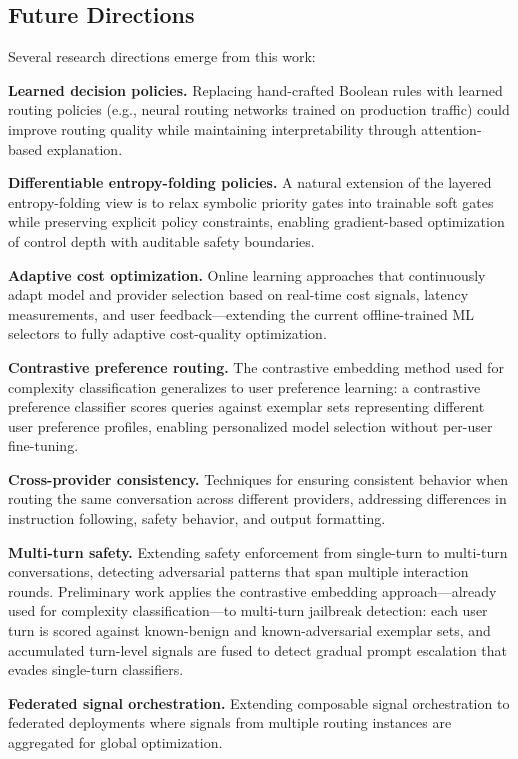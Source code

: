 \subsection{Future Directions}

Several research directions emerge from this work:

\noindent\textbf{Learned decision policies.}
Replacing hand-crafted Boolean rules with learned routing policies (e.g., neural routing networks trained on production traffic) could improve routing quality while maintaining interpretability through attention-based explanation.

\noindent\textbf{Differentiable entropy-folding policies.}
A natural extension of the layered entropy-folding view is to relax symbolic priority gates into trainable soft gates while preserving explicit policy constraints, enabling gradient-based optimization of control depth with auditable safety boundaries.

\noindent\textbf{Adaptive cost optimization.}
Online learning approaches that continuously adapt model and provider selection based on real-time cost signals, latency measurements, and user feedback---extending the current offline-trained ML selectors to fully adaptive cost-quality optimization.

\noindent\textbf{Contrastive preference routing.}
The contrastive embedding method used for complexity classification generalizes to user preference learning: a contrastive preference classifier scores queries against exemplar sets representing different user preference profiles, enabling personalized model selection without per-user fine-tuning.

\noindent\textbf{Cross-provider consistency.}
Techniques for ensuring consistent behavior when routing the same conversation across different providers, addressing differences in instruction following, safety behavior, and output formatting.

\noindent\textbf{Multi-turn safety.}
Extending safety enforcement from single-turn to multi-turn conversations, detecting adversarial patterns that span multiple interaction rounds.
Preliminary work applies the contrastive embedding approach---already used for complexity classification---to multi-turn jailbreak detection: each user turn is scored against known-benign and known-adversarial exemplar sets, and accumulated turn-level signals are fused to detect gradual prompt escalation that evades single-turn classifiers.

\noindent\textbf{Federated signal orchestration.}
Extending composable signal orchestration to federated deployments where signals from multiple routing instances are aggregated for global optimization.

